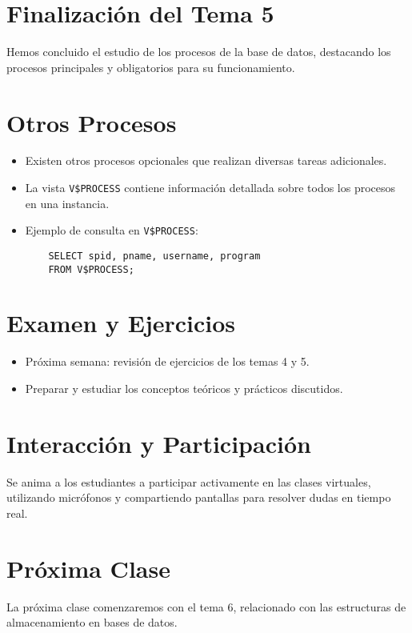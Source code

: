 \documentclass{article}
\begin{document}
\section{Finalización del Tema 5}
Hemos concluido el estudio de los procesos de la base de datos, destacando los procesos principales y obligatorios para su funcionamiento.

\section{Otros Procesos}
\begin{itemize}
    \item Existen otros procesos opcionales que realizan diversas tareas adicionales.
    \item La vista \texttt{V\$PROCESS} contiene información detallada sobre todos los procesos en una instancia.
    \item Ejemplo de consulta en \texttt{V\$PROCESS}:
    \begin{verbatim}
    SELECT spid, pname, username, program
    FROM V$PROCESS;
    \end{verbatim}
\end{itemize}

\section{Examen y Ejercicios}
\begin{itemize}
    \item Próxima semana: revisión de ejercicios de los temas 4 y 5.
    \item Preparar y estudiar los conceptos teóricos y prácticos discutidos.
\end{itemize}

\section{Interacción y Participación}
Se anima a los estudiantes a participar activamente en las clases virtuales, utilizando micrófonos y compartiendo pantallas para resolver dudas en tiempo real.

\section{Próxima Clase}
La próxima clase comenzaremos con el tema 6, relacionado con las estructuras de almacenamiento en bases de datos.
\end{document}
